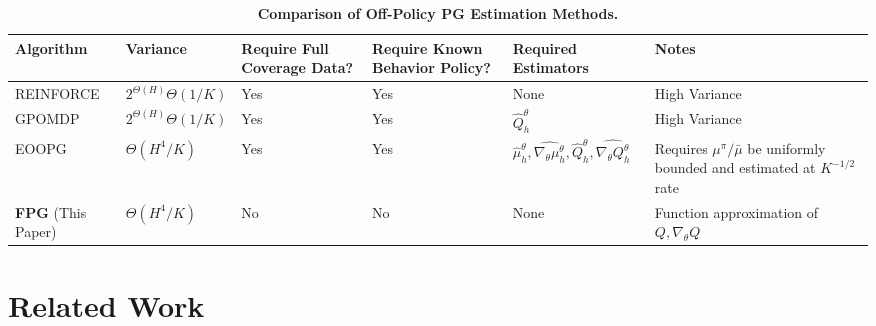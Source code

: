 \documentclass{article}
\numberwithin{equation}{section}
\begin{document}
\begin{table*}[htb!]
    \centering
	\caption{\textbf{Comparison of Off-Policy PG Estimation Methods.}}  
	\label{table_off_policy_PG_methods} 
    \begin{tabular}{m{3.5cm}<{\centering} m{2cm}<{\centering} m{1.5cm}<{\centering} m{1.5cm}<{\centering} m{3cm}<{\centering} m{3.8cm}<{\centering}}
    \toprule
    Algorithm & Variance & Require Full Coverage Data? & Require Known Behavior Policy? & Required Estimators & Notes\\
    \hline
       REINFORCE \cite{kakade2001natural,shelton2013policy}  & $2^{\Theta(H)} \Theta(1/K)$  & Yes & Yes & None & High Variance\\
    \hline
        GPOMDP \cite{kakade2001natural,shelton2013policy} & $2^{\Theta(H)} \Theta(1/K)$ & Yes & Yes & $\widehat{Q}_h^\theta$ & High Variance\\
        \hline
        EOOPG \cite{kallus2020statistically} & $\Theta(H^4/K)$  & Yes & Yes & $\widehat{\mu}_h^\theta,\widehat{\nabla_\theta\mu_h^\theta},\widehat{Q}_h^\theta,\widehat{\nabla_\theta Q_h^\theta}$ & Requires $\mu^{\pi}/\bar\mu$ be uniformly bounded and estimated at $K^{-1/2}$ rate\\
        \hline
        \textbf{FPG} (This Paper) & $\Theta(H^4/K)$ & No & No & None & Function approximation of $Q,\nabla_{\theta} Q$\\
        \bottomrule
    \end{tabular}
\end{table*}

\section{Related Work}



\end{document}
